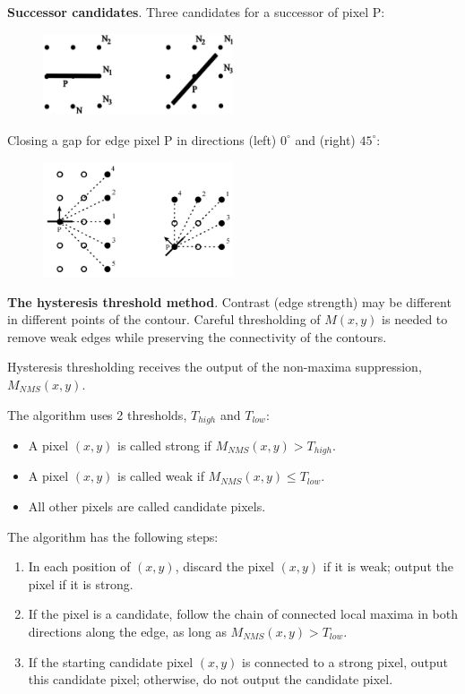 \documentclass[letterpaper,12pt]{article}
\begin{document}
\textbf{Successor candidates}. Three candidates for a successor of pixel P:

\begin{figure}[!th]
  \centering
  {\includegraphics[width=0.5\textwidth]{succ_cand1}\label{fig:succ_cand1}}
  \end{figure}

Closing a gap for edge pixel P in directions (left) $0^\circ$ and (right) $45^\circ$:
\begin{figure}[!th]
  \centering
  {\includegraphics[width=0.5\textwidth]{succ_cand2}\label{fig:succ_cand2}}
  \end{figure}
  
  
\textbf{The hysteresis threshold method}.
Contrast (edge strength) may be different in different points of the contour. Careful thresholding of $M(x,y)$ is needed to remove  weak edges while preserving the connectivity of the contours.

Hysteresis thresholding receives the output of the non-maxima suppression, $M_{NMS}(x,y)$.

The algorithm uses 2 thresholds, $T_{high}$ and $T_{low}$:

\begin{itemize}
	\item A pixel $(x,y)$ is called strong if $M_{NMS}(x,y) > T_{high}$.
	\item A pixel $(x,y)$ is called weak if $M_{NMS}(x,y) \leq T_{low}$.
	\item All other pixels are called candidate pixels.
\end{itemize}

The algorithm has the following steps:
\begin{enumerate}


	\item  In each position of $(x,y)$, discard the pixel $(x,y)$ if it is weak; output the pixel if it is strong.
	\item If the pixel is a candidate, follow the chain of connected local maxima in both directions along the edge, as long as $M_{NMS}(x,y) > T_{low}$.
	\item If the starting candidate pixel $(x,y)$ is connected to a strong pixel, output this candidate pixel; otherwise, do not output the candidate pixel.
\end{enumerate}
\end{document}

